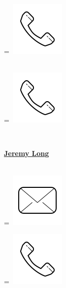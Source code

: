 \documentclass[]{latex/resume}
\begin{document}
\begin{minipage}[t]{0.25\textwidth}
    \begingroup
        =\hbox{
        \includegraphics[scale=0.1,trim={0 1.25cm -0.4cm 0cm}]{latex/icons/phone.png}\hspace{0.3cm}
        }
        \parbox{\wd0}{}
    \endgroup \\
    \begingroup
        =\hbox{
        \includegraphics[scale=0.1,trim={0 1.25cm -0.4cm 0cm}]{latex/icons/phone.png}\hspace{0.3cm}
        }
        \parbox{\wd0}{}
    \endgroup \\ 

    \sectionsep
    
    \href{}{\textbf{Jeremy Long}} \\
     \\

    \begingroup
        =\hbox{
            \includegraphics[scale=0.1,trim={0 1cm 0cm 0cm}]{latex/icons/mail.png} 
        }
        \parbox{\wd0}{}
    \endgroup
    \begingroup
        =\hbox{ \includegraphics[scale=0.1,trim={0 1.25cm -0.4cm 0cm}]{latex/icons/phone.png}\hspace{0.2cm} }
        \parbox{\wd0}{}
    \endgroup \\


\end{minipage}
\end{document}

